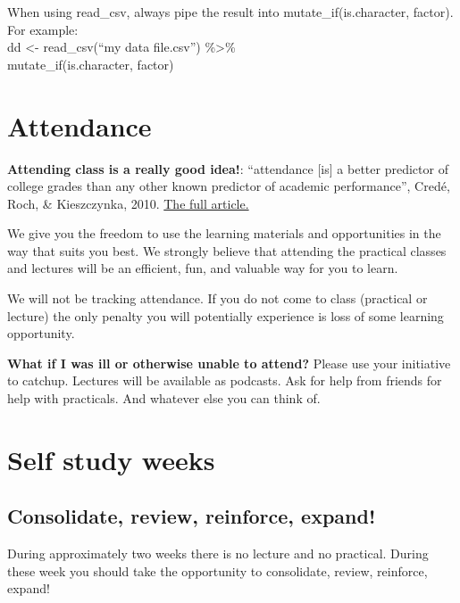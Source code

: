 \documentclass[
  letterpaper,
  8pt,
  a4paper]{book}
\begin{document}
When using read\_csv, always pipe the result into
mutate\_if(is.character, factor).\\
For example:\\
dd \textless- read\_csv(``my data file.csv'') \%\textgreater\%\\
mutate\_if(is.character, factor)

\section*{Attendance}\label{attendance}


\textbf{Attending class is a really good idea!}: ``attendance {[}is{]} a
better predictor of college grades than any other known predictor of
academic performance'', Credé, Roch, \& Kieszczynka, 2010.
\href{https://journals.sagepub.com/doi/abs/10.3102/0034654310362998}{The
full article.}

We give you the freedom to use the learning materials and opportunities
in the way that suits you best. We strongly believe that attending the
practical classes and lectures will be an efficient, fun, and valuable
way for you to learn.

We will not be tracking attendance. If you do not come to class
(practical or lecture) the only penalty you will potentially experience
is loss of some learning opportunity.

\textbf{What if I was ill or otherwise unable to attend?} Please use
your initiative to catchup. Lectures will be available as podcasts. Ask
for help from friends for help with practicals. And whatever else you
can think of.

\section*{Self study weeks}\label{self-study-weeks}


\subsection*{Consolidate, review, reinforce,
expand!}\label{consolidate-review-reinforce-expand}

During approximately two weeks there is no lecture and no practical.
During these week you should take the opportunity to consolidate,
review, reinforce, expand!
\end{document}
